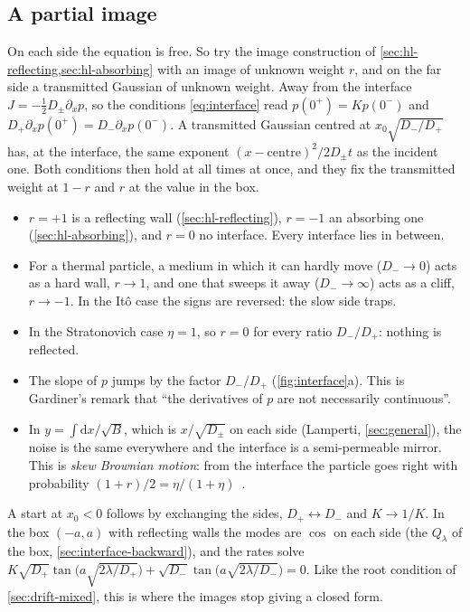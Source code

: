 \documentclass[11pt]{article}
\numberwithin{equation}{section}
\newcommand{\dd}{\mathrm{d}}
\begin{document}
\subsection{A partial image}

On each side the equation is free. So try the image construction of \cref{sec:hl-reflecting,sec:hl-absorbing} with
an image of unknown weight $r$, and on the far side a transmitted Gaussian of unknown weight. Away from the interface
$J=-\frac12D_\pm\partial_xp$, so the conditions \cref{eq:interface} read $p(0^+)=Kp(0^-)$ and
$D_+\partial_xp(0^+)=D_-\partial_xp(0^-)$. A transmitted Gaussian centred at $x_0\sqrt{D_-/D_+}$ has, at the
interface, the same exponent $(x-\text{centre})^2/2D_\pm t$ as the incident one. Both conditions then hold at all
times at once, and they fix the transmitted weight at $1-r$ and $r$ at the value in the box.
\begin{itemize}
  \item $r=+1$ is a reflecting wall (\cref{sec:hl-reflecting}), $r=-1$ an absorbing one (\cref{sec:hl-absorbing}),
        and $r=0$ no interface. Every interface lies in between.
  \item For a thermal particle, a medium in which it can hardly move ($D_-\to0$) acts as a hard wall, $r\to1$, and
        one that sweeps it away ($D_-\to\infty$) acts as a cliff, $r\to-1$. In the It\^o case the signs are
        reversed: the slow side traps.
  \item In the Stratonovich case $\eta=1$, so $r=0$ for every ratio $D_-/D_+$: nothing is reflected.
  \item The slope of $p$ jumps by the factor $D_-/D_+$ (\cref{fig:interface}a). This is Gardiner's remark that ``the
        derivatives of $p$ are not necessarily continuous''.
  \item In $y=\int\dd x/\sqrt B$, which is $x/\sqrt{D_\pm}$ on each side (Lamperti, \cref{sec:general}), the noise is
        the same everywhere and the interface is a semi-permeable mirror. This is \emph{skew Brownian motion}: from
        the interface the particle goes right with probability $(1+r)/2=\eta/(1+\eta)$~\cite{lejay}.
\end{itemize}
A start at $x_0<0$ follows by exchanging the sides, $D_+\leftrightarrow D_-$ and $K\to1/K$. In the box $(-a,a)$ with
reflecting walls the modes are $\cos$ on each side (the $Q_\lambda$ of the box, \cref{sec:interface-backward}), and the
rates solve $K\sqrt{D_+}\tan\bigl(a\sqrt{2\lambda/D_+}\bigr)+\sqrt{D_-}\tan\bigl(a\sqrt{2\lambda/D_-}\bigr)=0$. Like
the root condition of \cref{sec:drift-mixed}, this is where the images stop giving a closed form.
\end{document}
